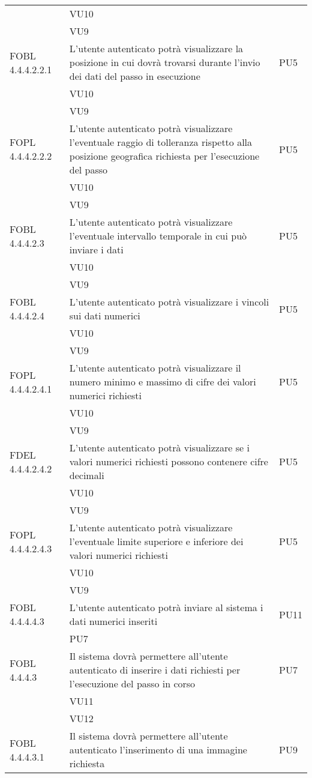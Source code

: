 \begin{longtable}{lXp{}}
&VU10\\ 
&VU9\\ 
\midrule 
FOBL 4.4.4.2.2.1&L'utente autenticato potrà visualizzare la posizione in cui dovrà trovarsi durante l'invio dei dati del passo in esecuzione&PU5\\ 
&VU10\\ 
&VU9\\ 
\midrule 
FOPL 4.4.4.2.2.2&L'utente autenticato potrà visualizzare l'eventuale raggio di tolleranza rispetto alla posizione geografica richiesta per l'esecuzione del passo	 &PU5\\ 
&VU10\\ 
&VU9\\ 
\midrule 
FOBL 4.4.4.2.3&L'utente autenticato potrà visualizzare l'eventuale intervallo temporale in cui può inviare i dati&PU5\\ 
&VU10\\ 
&VU9\\ 
\midrule 
FOBL 4.4.4.2.4&L'utente autenticato potrà visualizzare i vincoli sui dati numerici&PU5\\ 
&VU10\\ 
&VU9\\ 
\midrule 
FOPL 4.4.4.2.4.1&L'utente autenticato potrà visualizzare il numero minimo e massimo di cifre dei valori numerici richiesti&PU5\\ 
&VU10\\ 
&VU9\\ 
\midrule 
FDEL 4.4.4.2.4.2&L'utente autenticato potrà visualizzare se i valori numerici richiesti possono contenere cifre decimali&PU5\\ 
&VU10\\ 
&VU9\\ 
\midrule 
FOPL 4.4.4.2.4.3&L'utente autenticato potrà visualizzare l'eventuale limite superiore e inferiore dei valori numerici richiesti &PU5\\ 
&VU10\\ 
&VU9\\ 
\midrule 
FOBL 4.4.4.4.3&L'utente autenticato potrà inviare al sistema i dati numerici inseriti&PU11\\ 
&PU7\\ 
\midrule 
FOBL 4.4.4.3&Il sistema dovrà permettere all'utente autenticato di inserire i dati richiesti per l'esecuzione del passo in corso&PU7\\ 
&VU11\\ 
&VU12\\ 
\midrule 
FOBL 4.4.4.3.1&Il sistema dovrà permettere all'utente autenticato l'inserimento di una immagine richiesta&PU9\\ 

\end{longtable}
